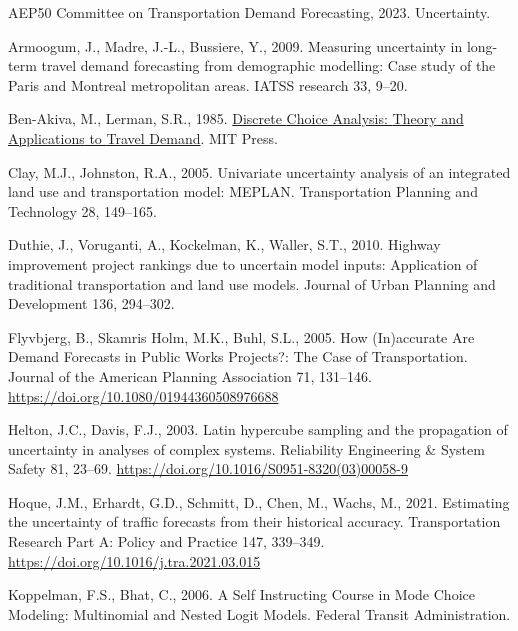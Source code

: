 \documentclass[
  futuretransp,
  submit,
  moreauthors,
]{Definitions/mdpi}
\newlength{\cslhangindent}
\newenvironment{CSLReferences}[2] %
 {\begin{list}{}{%
  \setlength{\itemindent}{0pt}
  \setlength{\leftmargin}{0pt}
  \setlength{\parsep}{0pt}
  \ifodd #1
   \setlength{\leftmargin}{\cslhangindent}
   \setlength{\itemindent}{-1\cslhangindent}
  \fi
  \setlength{\itemsep}{#2\baselineskip}}}
 {\end{list}}
\begin{document}

\label{refs}
\begin{CSLReferences}{1}{0}
AEP50 Committee on Transportation Demand Forecasting, 2023. Uncertainty.

Armoogum, J., Madre, J.-L., Bussiere, Y., 2009. Measuring uncertainty in
long-term travel demand forecasting from demographic modelling: {Case}
study of the {Paris} and {Montreal} metropolitan areas. IATSS research
33, 9--20.

Ben-Akiva, M., Lerman, S.R., 1985.
\href{https://www.jstor.org/stable/1391567}{Discrete {Choice Analysis}:
{Theory} and {Applications} to {Travel Demand}}. MIT Press.

Clay, M.J., Johnston, R.A., 2005. Univariate uncertainty analysis of an
integrated land use and transportation model: {MEPLAN}. Transportation
Planning and Technology 28, 149--165.

Duthie, J., Voruganti, A., Kockelman, K., Waller, S.T., 2010. Highway
improvement project rankings due to uncertain model inputs:
{Application} of traditional transportation and land use models. Journal
of Urban Planning and Development 136, 294--302.

Flyvbjerg, B., Skamris Holm, M.K., Buhl, S.L., 2005. How ({In})accurate
{Are Demand Forecasts} in {Public Works Projects}?: {The Case} of
{Transportation}. Journal of the American Planning Association 71,
131--146. \url{https://doi.org/10.1080/01944360508976688}

Helton, J.C., Davis, F.J., 2003. Latin hypercube sampling and the
propagation of uncertainty in analyses of complex systems. Reliability
Engineering \& System Safety 81, 23--69.
\url{https://doi.org/10.1016/S0951-8320(03)00058-9}

Hoque, J.M., Erhardt, G.D., Schmitt, D., Chen, M., Wachs, M., 2021.
Estimating the uncertainty of traffic forecasts from their historical
accuracy. Transportation Research Part A: Policy and Practice 147,
339--349. \url{https://doi.org/10.1016/j.tra.2021.03.015}

Koppelman, F.S., Bhat, C., 2006. A {Self Instructing Course} in {Mode
Choice Modeling}: {Multinomial} and {Nested Logit Models}. Federal
Transit Administration.


\end{CSLReferences}
\end{document}
